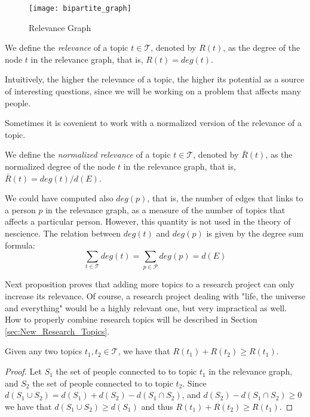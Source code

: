 \begin{figure}[h]
\centering\texttt{[image: bipartite\_graph]}
\caption{\label{fig:Relevance-Graph}Relevance Graph}
\end{figure}

\begin{definition}
\label{def:relevance}
We define the \emph{relevance} of a topic $t \in \mathcal{T}$, denoted by $R(t)$, as the degree of the node $t$ in the relevance graph, that is, $R(t) = deg(t)$.
\end{definition}

Intuitively, the higher the relevance of a topic, the higher its potential as a source of interesting questions, since we will be working on a problem that affects many people.

Sometimes it is covenient to work with a normalized version of the relevance of a topic.

\begin{definition}
\label{def:normalized_relevance}
We define the \emph{normalized relevance} of a topic $t \in \mathcal{T}$, denoted by $\bar{R}(t)$, as the normalized degree of the node $t$ in the relevance graph, that is, $\bar{R}(t) = deg(t) / d(E)$.
\end{definition}

We could have computed also $deg(p)$, that is, the number of edges that links to a person $p$ in the relevance graph, as a measure of the number of topics that affects a particular person. However, this quantity is not used in the theory of nescience. The relation between $deg(t)$ and $deg(p)$ is given by the degree sum formula:
\[
\sum_{t \in \mathcal{T}} deg(t) = \sum_{p \in \mathcal{P}} deg(p) = d(E)
\]

Next proposition proves that adding more topics to a research project can only increase its relevance. Of course, a research project dealing with "life, the universe and everything" would be a highly relevant one, but very impractical as well. How to properly combine research topics will be described in Section \ref{sec:New_Research_Topics}.

\begin{proposition}
\label{prop:nondecreasing_relevance}
Given any two topics $t_{1}, t_{2} \in \mathcal{T}$, we have that $R(t_{1}) + R(t_{2}) \geq R(t_{1})$.
\end{proposition}
\begin{proof}
Let $S_{1}$ the set of people connected to to topic $t_{1}$ in the relevance graph, and  $S_{2}$ the set of people connected to to topic $t_{2}$. Since $d \left( S_{1} \cup S_{2} \right) = d(S_{1}) + d(S_{2}) - d(S_{1} \cap S_{2})$, and $d(S_{2}) - d(S_{1} \cap S_{2}) \geq 0$ we have that $d \left( S_{1} \cup S_{2} \right) \geq d(S_{1})$ and thus $R(t_{1}) + R(t_{2}) \geq R(t_{1})$.
\end{proof} 

